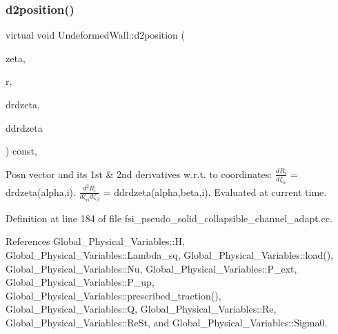 \mbox{\label{classUndeformedWall_a709e65fc95e9443a886125e455595e5d}} 
\subsubsection{\texorpdfstring{d2position()}{d2position()}\hspace{0.1cm}{\footnotesize\ttfamily [4/4]}}
{\footnotesize\ttfamily virtual void Undeformed\+Wall\+::d2position (\begin{DoxyParamCaption}\item[{const Vector$<$ double $>$ \&}]{zeta,  }\item[{Vector$<$ double $>$ \&}]{r,  }\item[{Dense\+Matrix$<$ double $>$ \&}]{drdzeta,  }\item[{Rank\+Three\+Tensor$<$ double $>$ \&}]{ddrdzeta }\end{DoxyParamCaption}) const\hspace{0.3cm}{\ttfamily [inline]}, {\ttfamily [virtual]}}



Posn vector and its 1st \& 2nd derivatives w.\+r.\+t. to coordinates\+: $ \frac{dR_i}{d \zeta_\alpha}$ = drdzeta(alpha,i). $ \frac{d^2R_i}{d \zeta_\alpha d \zeta_\beta}$ = ddrdzeta(alpha,beta,i). Evaluated at current time. 



Definition at line 184 of file fsi\+\_\+pseudo\+\_\+solid\+\_\+collapsible\+\_\+channel\+\_\+adapt.\+cc.



References Global\+\_\+\+Physical\+\_\+\+Variables\+::H, Global\+\_\+\+Physical\+\_\+\+Variables\+::\+Lambda\+\_\+sq, Global\+\_\+\+Physical\+\_\+\+Variables\+::load(), Global\+\_\+\+Physical\+\_\+\+Variables\+::\+Nu, Global\+\_\+\+Physical\+\_\+\+Variables\+::\+P\+\_\+ext, Global\+\_\+\+Physical\+\_\+\+Variables\+::\+P\+\_\+up, Global\+\_\+\+Physical\+\_\+\+Variables\+::prescribed\+\_\+traction(), Global\+\_\+\+Physical\+\_\+\+Variables\+::Q, Global\+\_\+\+Physical\+\_\+\+Variables\+::\+Re, Global\+\_\+\+Physical\+\_\+\+Variables\+::\+Re\+St, and Global\+\_\+\+Physical\+\_\+\+Variables\+::\+Sigma0.

\mbox{\label{classUndeformedWall_ab0410681e2096091319a79e79937cba3}} 
